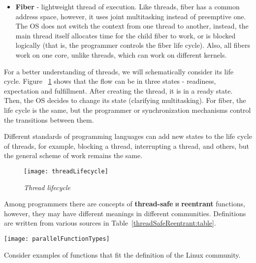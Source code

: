 {\begin{itemize}
			\item\textbf{Fiber} - lightweight thread of execution. Like threads, fiber has a common address space, however, it uses joint multitasking instead of preemptive one. The OS does not switch the context from one thread to another, instead, the main thread itself allocates time for the child fiber to work, or is blocked logically (that is, the programmer controls the fiber life cycle). Also, all fibers work on one core, unlike threads, which can work on different kernels.
		\end{itemize}
	\par For a better understanding of threads, we will schematically consider its life cycle. Figure ~\ref{threadLifecycle:image} shows that the flow can be in three states - readiness, expectation and fulfillment. After creating the thread, it is in a ready state. Then, the OS decides to change its state (clarifying multitasking). For fiber, the life cycle is the same, but the programmer or synchronization mechanisms control the transitions between them.
	\par Different standards of programming languages can add new states to the life cycle of threads, for example, blocking a thread, interrupting a thread, and others, but the general scheme of work remains the same.
		\begin{figure}[H]
			\texttt{[image: threadLifecycle]}
			\caption{\textit{Thread lifecycle}}
			\label{threadLifecycle:image}
		\end{figure}
	\par Among programmers there are concepts of \textbf{thread-safe} и \textbf{reentrant} functions, however, they may have different meanings in different communities. Definitions are written from various sources in Table~\ref{threadSafeReentrant:table}.
	\begin{table}[H]
		\caption{Definitions of thread-safe and reentrant functions}
		\label{threadSafeReentrant:table}
		\begin{center}
					\texttt{[image: parallelFunctionTypes]}
		\end{center}
	\end{table}
	\par Consider examples of functions that fit the definition of the Linux community.
}

